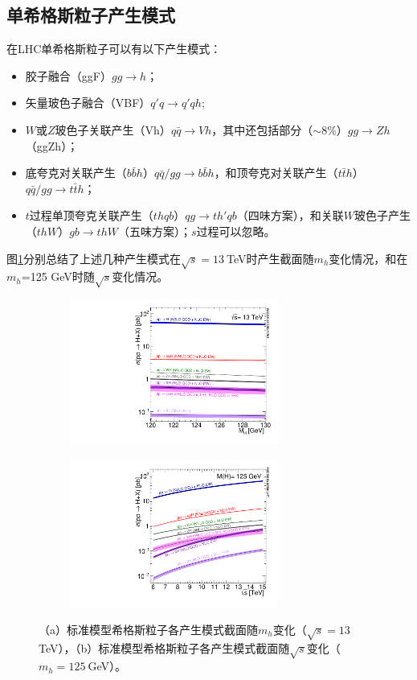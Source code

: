 \subsection{单希格斯粒子产生模式}
在LHC单希格斯粒子可以有以下产生模式：
\begin{itemize}
 \item 胶子融合（ggF）$gg\rightarrow h$；
 \item 矢量玻色子融合（VBF）$q\prime{q}\rightarrow q\prime{q}h$;
 \item $W$或$Z$玻色子关联产生（Vh）$q\bar{q}\rightarrow Vh$，其中还包括部分（$\sim$8\%）$gg\rightarrow Zh$（ggZh）；
 \item 底夸克对关联产生（$b\bar{b}h$）$q\bar{q}/gg\rightarrow b\bar{b}h$，和顶夸克对关联产生（$t\bar{t}h$）$q\bar{q}/gg\rightarrow t\bar{t}h$；
 \item $t$过程单顶夸克关联产生（$thqb$）$qg\rightarrow th\prime{q}b$（四味方案），和关联$W$玻色子产生（$thW$）$gb\rightarrow thW$（五味方案）；$s$过程可以忽略。
\end{itemize}
图\ref{fig:LHCHIGGSWG}分别总结了上述几种产生模式在$\sqrt{s}=13~$TeV时产生截面随$m_h$变化情况，和在$m_h$=125 GeV时随$\sqrt{s}$变化情况。
\begin{figure}[h]
\centering
 \begin{subfigure}[b]{0.45\textwidth}
  \includegraphics[width=0.75\textwidth,angle=-90]{fig/plot_13tev_H_sqrt.pdf}
  \caption{}
 \end{subfigure}
 \begin{subfigure}[b]{0.45\textwidth}
  \includegraphics[width=0.75\textwidth,angle=-90]{fig/Plot_Escan_H125_new_sqrt.pdf}
  \caption{}
 \end{subfigure}
\caption{（a）标准模型希格斯粒子各产生模式截面随$m_h$变化（$\sqrt{s}=13~$TeV），（b）标准模型希格斯粒子各产生模式截面随$\sqrt{s}$变化（$m_h=125~$GeV）。}
\label{fig:LHCHIGGSWG}
\end{figure}
